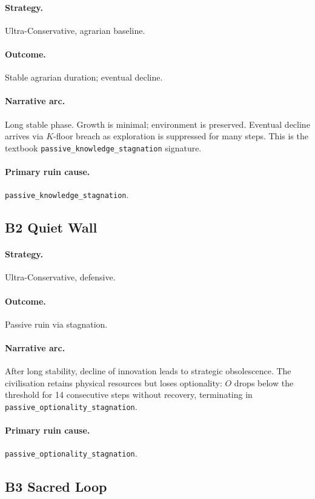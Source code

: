 \paragraph{Strategy.} Ultra-Conservative, agrarian baseline.
\paragraph{Outcome.} Stable agrarian duration; eventual decline.
\paragraph{Narrative arc.}
Long stable phase. Growth is minimal; environment is preserved.
Eventual decline arrives via $K$-floor breach as exploration is
suppressed for many steps. This is the textbook
\texttt{passive\_knowledge\_stagnation} signature.
\paragraph{Primary ruin cause.}
\texttt{passive\_knowledge\_stagnation}.

\subsection{B2 Quiet Wall}
\label{civ:b2}

\paragraph{Strategy.} Ultra-Conservative, defensive.
\paragraph{Outcome.} Passive ruin via stagnation.
\paragraph{Narrative arc.}
After long stability, decline of innovation leads to strategic
obsolescence. The civilisation retains physical resources but
loses optionality: $O$ drops below the threshold for 14
consecutive steps without recovery, terminating in
\texttt{passive\_optionality\_stagnation}.
\paragraph{Primary ruin cause.}
\texttt{passive\_optionality\_stagnation}.

\subsection{B3 Sacred Loop}
\label{civ:b3}

